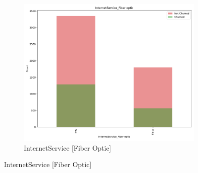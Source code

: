 \documentclass[a4paper,11pt]{article}
\begin{document}
\begin{landscape}
\begin{figure}
\begin{subfigure}{0.14\linewidth}
    \includegraphics[width=\linewidth]{figures/understanding/InternetService_Fiber optic.pdf}
    \caption{InternetService [Fiber Optic]}
\end{subfigure}


\end{figure}
\end{landscape}
\end{document}
